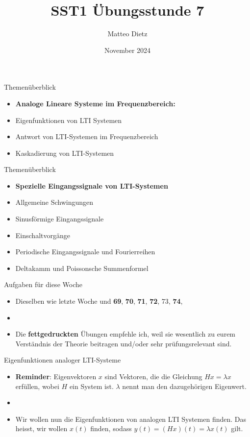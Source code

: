 \documentclass[14pt, aspectratio=169, handout]{beamer}
\title{SST1 Übungsstunde 7}
\author{Matteo Dietz}
\date{November 2024}
\begin{document}
\maketitle

\begin{frame}{Themenüberblick}
    \begin{itemize}
        \item \textbf{Analoge Lineare Systeme im Frequenzbereich:}
        \item[] Eigenfunktionen von LTI Systemen
        \item[] Antwort von LTI-Systemen im Frequenzbereich
        \item[] Kaskadierung von LTI-Systemen
    \end{itemize}
\end{frame}

\begin{frame}{Themenüberblick}
    \begin{itemize}
        \item \textbf{Spezielle Eingangssignale von LTI-Systemen}
        \item[] Allgemeine Schwingungen
        \item[] Sinusförmige Eingangssignale 
        \item[] Einschaltvorgänge
        \item[] Periodische Eingangssignale und Fourierreihen
        \item[] Deltakamm und Poissonsche Summenformel
    \end{itemize}
\end{frame}

\begin{frame}{Aufgaben für diese Woche}
    \begin{itemize}
        \item[] Dieselben wie letzte Woche und \textbf{69}, \textbf{70}, \textbf{71}, \textbf{72}, 73, \textbf{74}, 
        \item[] 
        \item[] Die \textbf{fettgedruckten} Übungen empfehle ich, weil sie wesentlich zu eurem Verständnis der Theorie beitragen und/oder sehr prüfungsrelevant sind.
    \end{itemize}
\end{frame}

\begin{frame}{Eigenfunktionen analoger LTI-Systeme}
    \begin{itemize}
        \item \textbf{Reminder}: Eigenvektoren $x$ sind Vektoren, die die Gleichung $Hx = \lambda x$ erfüllen, wobei $H$ ein System ist. $\lambda$ nennt man den dazugehörigen Eigenwert.
        \item[] 
        \item Wir wollen nun die Eigenfunktionen von analogen LTI Systemen finden. Das heisst, wir wollen $x(t)$ finden, sodass $y(t) = (Hx)(t) = \lambda x(t)$ gilt.
    \end{itemize}
\end{frame}
\end{document}
